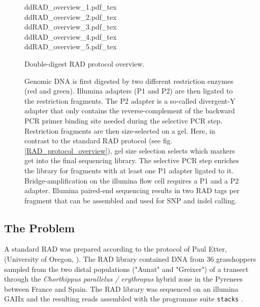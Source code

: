 \documentclass[a4paper,12pt,times,print,index, custombib]{PhDThesisPSnPDF}\usepackage[]{graphicx}\usepackage[]{color}
\begin{document}
\begin{figure}
\def\svgwidth{.9\textwidth}
{ddRAD_overview_1.pdf_tex}\\ 
\def\svgwidth{\textwidth}
{ddRAD_overview_2.pdf_tex}\\
\def\svgwidth{.9\textwidth}
{ddRAD_overview_3.pdf_tex}\\
\def\svgwidth{.9\textwidth}
{ddRAD_overview_4.pdf_tex}\\
\def\svgwidth{.9\textwidth}
{ddRAD_overview_5.pdf_tex}
\caption[Double-digest RAD protocol overview.]{Double-digest RAD protocol overview.}
\label{ddRAD_protocol_overview}
\end{figure}

\begin{figure}[t]
\ContinuedFloat
\caption[]{Genomic DNA is first digested by two different restriction enzymes (red and green). Illumina adapters (P1 and P2) are then ligated to the restriction fragments. The P2 adapter is a so-called divergent-Y adapter that only contains the reverse-complement of the backward PCR primer binding site needed during the selective PCR step. Restriction fragments are then size-selected on a gel. Here, in contrast to the standard RAD protocol (see fig. \ref{RAD_protocol_overview}), gel size selection selects which markers get into the final sequencing library. The selective PCR step enriches the library for fragments with at least one P1 adapter ligated to it. Bridge-amplification on the illumina flow cell requires a P1 and a P2 adapter. Illumina paired-end sequencing results in two RAD tags per fragment that can be assembled and used for SNP and indel calling.}
\end{figure}


\subsection{The Problem}

A standard RAD was prepared according to the protocol of Paul Etter, (University of Oregon, \citealt{Baird2008}). The RAD library contained DNA from 36 grasshoppers sampled from the two distal populations ("Aunat" and "Greixer") of a transect through the \textit{Chorthippus parallelus / erythropus} hybrid zone in the Pyrenees between France and Spain. The RAD library was sequenced on an illumina GAIIx and the resulting reads assembled with the programme suite \texttt{stacks} \citep{Catchen2011}.
\end{document}
